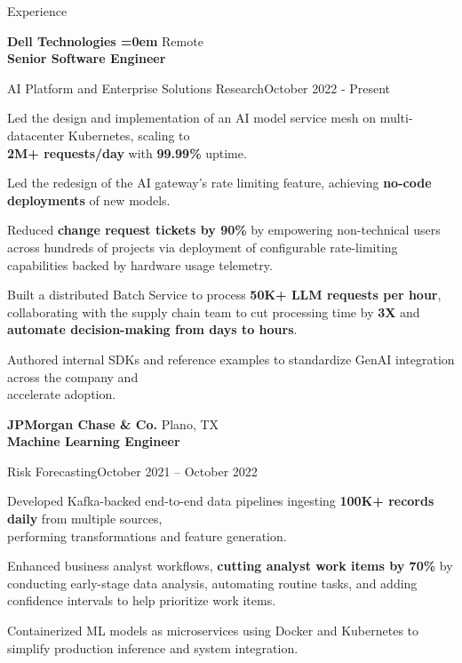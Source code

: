 \documentclass[
	9pt, %
]{resume} %
\begin{document}

\begin{rSection}{Experience}

    \textbf{Dell Technologies {\leftmargin=0em}} \hfill {Remote } \\
    \textbf{Senior Software Engineer}
    \begin{rSubsection}{AI Platform and Enterprise Solutions Research}{October 2022 - Present}
        \item Led the design and implementation of an AI model service mesh on multi-datacenter Kubernetes, scaling to \\\textbf{2M+ requests/day} with \textbf{99.99\%} uptime.

        \item Led the redesign of the AI gateway’s rate limiting feature, achieving \textbf{no-code deployments} of new models.
        \item Reduced \textbf{change request tickets by 90\%} by empowering non-technical users across hundreds of projects via deployment of configurable rate-limiting capabilities backed by hardware usage telemetry.
        \item Built a distributed Batch Service to process \textbf{50K+ LLM requests per hour}, collaborating with the supply chain team to cut processing time by \textbf{3X} and \textbf{automate decision-making from days to hours}.
        \item Authored internal SDKs and reference examples to standardize GenAI integration across the company and \\accelerate adoption.
	\end{rSubsection}


    \textbf{JPMorgan Chase \& Co.} \hfill {Plano, TX } \\
    \textbf{Machine Learning Engineer}
    \begin{rSubsection}{Risk Forecasting}{October 2021 -- October 2022}
        \item Developed Kafka-backed end-to-end data pipelines ingesting \textbf{100K+ records daily} from multiple sources, \\performing transformations and feature generation.
        \item Enhanced business analyst workflows, \textbf{cutting analyst work items by 70\%} by conducting early-stage data analysis, automating routine tasks, and adding confidence intervals to help prioritize work items.
        \item Containerized ML models as microservices using Docker and Kubernetes to simplify production inference and system integration.
    \end{rSubsection}


\end{rSection}
\end{document}
